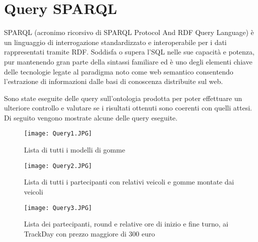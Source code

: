 \chapter{Query SPARQL}
SPARQL (acronimo ricorsivo di SPARQL Protocol And RDF Query Language) è un linguaggio di interrogazione standardizzato e interoperabile per i dati rappresentati tramite RDF. Soddisfa o supera l’SQL nelle sue capacità e potenza, pur mantenendo gran parte della sintassi familiare ed è uno degli elementi chiave delle tecnologie legate al paradigma noto come web semantico consentendo l'estrazione di informazioni dalle basi di conoscenza distribuite sul web.
\\\par
Sono state eseguite delle query sull'ontologia prodotta per poter effettuare un ulteriore controllo e valutare se i risultati ottenuti sono coerenti con quelli attesi. Di seguito vengono mostrate alcune delle query eseguite.
\\\par
\begin{figure}[h]
	\centering
	\texttt{[image: Query1.JPG]}
	\caption{Lista di tutti i modelli di gomme}
\end{figure}
\clearpage
\begin{figure}[h]
	\centering
	\texttt{[image: Query2.JPG]}
	\caption{Lista di tutti i partecipanti con relativi veicoli e gomme montate dai veicoli}
\end{figure}
\clearpage
\begin{figure}[h]
	\centering
	\texttt{[image: Query3.JPG]}
	\caption{Lista dei partecipanti, round e relative ore di inizio e fine turno, ai TrackDay con prezzo maggiore di 300 euro}
\end{figure}
\clearpage
